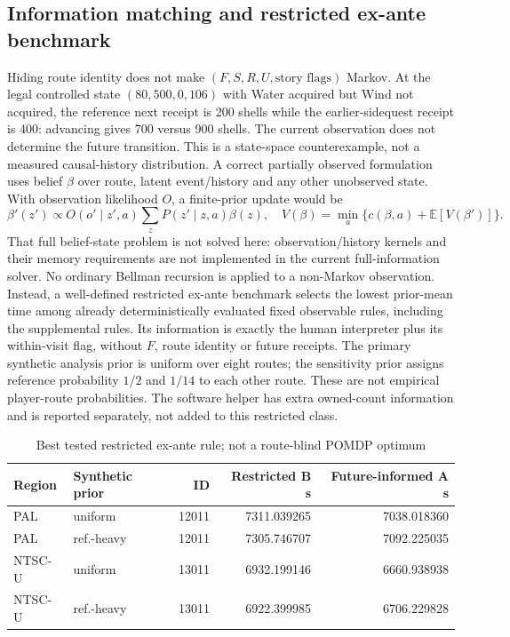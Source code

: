 \documentclass[11pt]{article}
\theoremstyle{definition}\newtheorem{definition}[theorem]{Definition}
\begin{document}
\subsection{Information matching and restricted ex-ante benchmark}
Hiding route identity does not make $(F,S,R,U,\text{story flags})$ Markov. At the legal controlled state $(80,500,0,106)$ with Water acquired but Wind not acquired, the reference next receipt is 200 shells while the earlier-sidequest receipt is 400: advancing gives 700 versus 900 shells. The current observation does not determine the future transition. This is a state-space counterexample, not a measured causal-history distribution.
A correct partially observed formulation uses belief $\beta$ over route, latent event/history and any other unobserved state. With observation likelihood $O$, a finite-prior update would be
\[
\beta'(z')\propto O(o'\mid z',a)\sum_z P(z'\mid z,a)\beta(z),
\quad V(\beta)=\min_a\{c(\beta,a)+\mathbb E[V(\beta')]\}.
\]
That full belief-state problem is not solved here: observation/history kernels and their memory requirements are not implemented in the current full-information solver. No ordinary Bellman recursion is applied to a non-Markov observation.
Instead, a well-defined restricted ex-ante benchmark selects the lowest prior-mean time among already deterministically evaluated fixed observable rules, including the supplemental rules. Its information is exactly the human interpreter plus its within-visit flag, without $F$, route identity or future receipts. The primary synthetic analysis prior is uniform over eight routes; the sensitivity prior assigns reference probability $1/2$ and $1/14$ to each other route. These are not empirical player-route probabilities. The software helper has extra owned-count information and is reported separately, not added to this restricted class.
\begin{table}[H]\centering\small
\begin{tabular}{llrrr}\toprule
Region & Synthetic prior & ID & Restricted B s & Future-informed A s\\\midrule
PAL & uniform & 12011 & 7311.039265 & 7038.018360\\
PAL & ref.-heavy & 12011 & 7305.746707 & 7092.225035\\
NTSC-U & uniform & 13011 & 6932.199146 & 6660.938938\\
NTSC-U & ref.-heavy & 13011 & 6922.399985 & 6706.229828\\
\bottomrule\end{tabular}
\caption{Best tested restricted ex-ante rule; not a route-blind POMDP optimum}\label{tab:synthetic-benchmark}\end{table}
\end{document}
